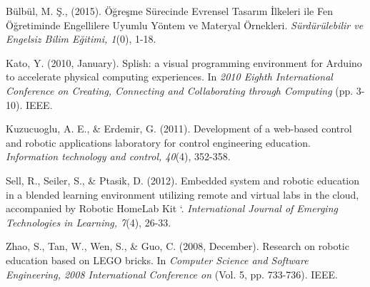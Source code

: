 \documentclass[11.5pt]{sig-alternate} %
\begin{document}
Bülbül, M. Ş., (2015). Öğreşme Sürecinde Evrensel Tasarım İlkeleri ile Fen Öğretiminde Engellilere Uyumlu Yöntem ve Materyal Örnekleri. \textit{Sürdürülebilir ve Engelsiz Bilim Eğitimi, 1}(0), 1-18.

Kato, Y. (2010, January). Splish: a visual programming environment for Arduino to accelerate physical computing experiences. In \textit{2010 Eighth International Conference on Creating, Connecting and Collaborating through Computing} (pp. 3-10). IEEE. 

Kuzucuoglu, A. E., \& Erdemir, G. (2011). Development of a web-based control and robotic applications laboratory for control engineering education. \textit{Information technology and control, 40}(4), 352-358.

Sell, R., Seiler, S., \& Ptasik, D. (2012). Embedded system and robotic education in a blended learning environment utilizing remote and virtual labs in the cloud, accompanied by Robotic HomeLab Kit ‘. \textit{International Journal of Emerging Technologies in Learning, 7}(4), 26-33. 

Zhao, S., Tan, W., Wen, S., \& Guo, C. (2008, December). Research on robotic education based on LEGO bricks. In \textit{Computer Science and Software Engineering, 2008 International Conference on} (Vol. 5, pp. 733-736). IEEE. 
\end{document}
